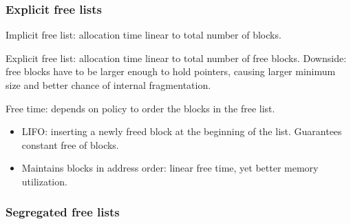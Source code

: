 \subsubsection{Explicit free lists}
Implicit free list: allocation time linear to total number of blocks. 

Explicit free list: allocation time linear to total number of free blocks. Downside: free blocks have to be larger enough to hold pointers, causing larger minimum size and better chance of internal fragmentation.
\begin{figure}[ht]
\end{figure}
Free time: depends on policy to order the blocks in the free list.
\begin{itemize}
	\item LIFO: inserting a newly freed block at the beginning of the list. Guarantees constant free of blocks.
	\item Maintains blocks in address order: linear free time, yet better memory utilization. 
\end{itemize}
\subsubsection{Segregated free lists}
\ifx\PREAMBLE\undefined

\fi